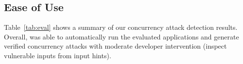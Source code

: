 


\subsection{Ease of Use}\label{sec:ease-of-use}
Table~\ref{tab:eval} shows a summary of our concurrency attack detection 
results. Overall, \xxx was able to automatically run the evaluated applications 
and generate verified concurrency attacks with moderate developer intervention 
(inspect vulnerable inputs from input hints).


